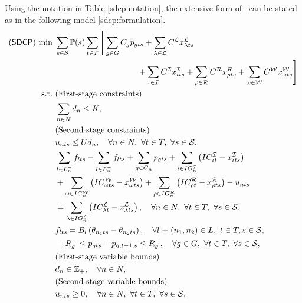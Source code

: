 Using the notation in Table \ref{sdcp:notation}, the extensive form of \sdcp\ can be stated as in the following model \ref{sdcp:formulation}.
\begin{subequations} \label{sdcp:formulation}
	\begin{align}
	(\sdcp)\ \textrm{min}\ &\sum_{s\in\mathcal{S}}\PP(s)\sum_{t\in T} 
	\Bigg[\sum_{g\in G}C_g p_{gts} + \sum_{\lambda\in \mathcal{L}} C^{\mathcal{L}}x_{\lambda ts}^{\mathcal{L}} \nonumber \\&\qquad\qquad\qquad\qquad\qquad + \sum_{\iota\in \mathcal{I}} C^{\mathcal{I}}x_{\iota ts}^{\mathcal{I}} + \sum_{\rho\in \mathcal{R}} C^{\mathcal{R}}x_{\rho ts}^{\mathcal{R}} + \sum_{\omega\in \mathcal{W}} C^{\mathcal{W}}x_{\omega ts}^{\mathcal{W}} \Bigg]
	\label{sdcp:obj}\\
	\textrm{s.t.}\ &  \textrm{(First-stage constraints)} \nonumber\\
	&\sum_{n\in N} d_n \le K,\label{sdcp:b}\\
	&\textrm{(Second-stage constraints)} \nonumber\\
	&u_{nts} \le Ud_n,\quad\forall n\in N,\ \forall t\in T,\ \forall s\in\mathcal{S},\label{sdcp:c}\\
	&\sum_{l\in L_n^+}f_{lts}-\sum_{l\in L_n^-}f_{lts}+\sum_{g\in G_n}p_{gts}+\sum_{\iota\in IG_n^\mathcal{I}}\left(IC_{\iota t}^\mathcal{I}-x_{\iota ts}^\mathcal{I}\right)\nonumber\\
	&+\sum_{\omega\in IG_n^\mathcal{W}}\left(IC_{\omega ts}^\mathcal{W}-x_{\omega ts}^\mathcal{W}\right)
	+\sum_{\rho\in IG_n^\mathcal{R}}\left(IC_{\rho t}^\mathcal{R}-x_{\rho ts}^\mathcal{R}\right)
	-u_{nts} \nonumber\\
	&=\sum_{\lambda\in IG_n^\mathcal{L}}\left(IC_{\lambda t}^\mathcal{L}-x_{\lambda ts}^\mathcal{L}\right),\quad\forall n\in N,\ \forall t\in T,\ \forall s\in\mathcal{S},\label{sdcp:d}\\
	&f_{lts}=B_l\left(  \theta_{n_1 ts}-\theta_{n_2 ts}  \right),\quad\forall l\equiv (n_1, n_2)\in L,\ t\in T, s\in\mathcal{S},\label{sdcp:e}\\
	&-R_g^- \le p_{gts}-p_{g,t-1,s} \le R_g^+ ,\quad\forall g\in G,\ \forall t\in T,\ \forall s\in\mathcal{S},\label{sdcp:f}\\
	&  \textrm{(First-stage variable bounds)} \nonumber\\
	&d_n \in \mathbb{Z}_+,\quad \forall n\in N,\label{sdcp:g}\\
	&  \textrm{(Second-stage variable bounds)} \nonumber\\
	&u_{nts}\ge 0,\quad\forall n\in N,\ \forall t\in T,\ \forall s\in\mathcal{S},\label{sdcp:h}\\

\end{align}
\end{subequations}
